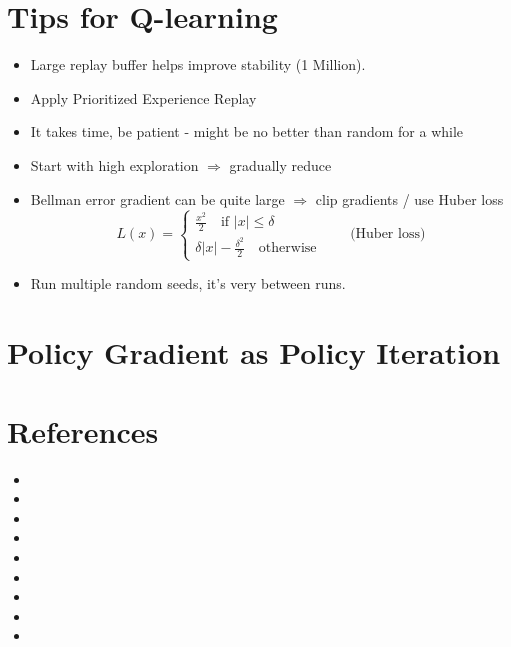 \section{Tips for Q-learning}
\begin{itemize}
	\item Large replay buffer helps improve stability (1 Million).
	\item Apply Prioritized Experience Replay \cite{schaul2015prioritized}
	\item It takes time, be patient - might be no better than random for a while
	\item Start with high exploration $\Rightarrow$ gradually reduce
	\item Bellman error gradient can be quite large $\Rightarrow$ clip gradients / use Huber loss
	\begin{equation}
		L(x) = \begin{cases}
			\frac{x^2}{2} \quad \text{if } |x| \leq \delta\\
			\delta|x| - \frac{\delta^2}{2} \quad \text{otherwise}
		\end{cases} \qquad \text{(Huber loss)}
	\end{equation}
	\item Run multiple random seeds, it's very  between runs.	
\end{itemize}

\section{Policy Gradient as Policy Iteration}

\section{References}
\begin{itemize}
	\item {}
	\item {}
	\item {}
	\item {}
	\item {}
	\item {}
	\item {}
	\item {}
	\item {}
\end{itemize}
